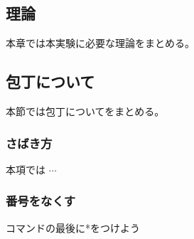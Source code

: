 \documentclass[a4j, titlepage]{jarticle}
\begin{document}
\begin{multicols}{2}
\begin{screen}
    \section{理論}
    本章では本実験に必要な理論をまとめる。

    \subsection{包丁について}
    本節では包丁についてをまとめる。

    \subsubsection{さばき方}
    本項では $\cdots$

\end{screen}


\end{multicols}
\setcounter{section}{1}
\subsubsection{番号をなくす}
コマンドの最後に*をつけよう
\end{document}
